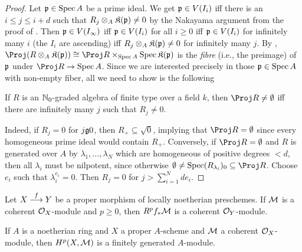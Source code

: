\documentclass[a4paper,parskip=half,numbers=enddot, DIV=12]{scrreprt}
\renewcommand{\leq}{\leqslant}
\renewcommand{\geq}{\geqslant}
\begin{document}
\begin{proof}
	Let $\mathfrak{p}\in \operatorname{Spec} A$ be a prime ideal. We get $\mathfrak{p}\in V(I_i)$ iff there is an $i\leq j\leq i+d$ such that $R_j\otimes_A\mathfrak{K}(\mathfrak{p})\neq 0$ by the Nakayama argument from the proof of \cite[Proposition~2.6.1]{alggeo1}. Then $\mathfrak{p}\in V(I_\infty)$ iff $\mathfrak{p}\in V(I_i)$ for all $i\geq 0$ iff $\mathfrak{p}\in V(I_i)$ for infinitely many $i$ (the $I_i$ are ascending) iff $R_j\otimes_A\mathfrak{K}(\mathfrak{p})\neq 0$ for infinitely many $j$. By \cite[Corollary~1.3.3]{alggeo1}, $\Proj(R\otimes_A\KK(\pp))\cong \Proj R\times_{\Spec A}\Spec \KK(\pp)$ is the \emph{fibre} (i.e., the preimage) of $\mathfrak{p}$ under $\Proj R\morphism\Spec A$. Since we are interested precisely in those $\mathfrak{p}\in\operatorname{Spec} A$ with non-empty fiber, all we need to show is the following
	\begin{claim*}
		If $R$ is an $\mathbb{N}_0$-graded algebra of finite type over a field $k$, then $\Proj R\neq\emptyset$ iff there are infinitely many $j$ such that $R_j\neq 0$.
	\end{claim*}
	Indeed, if $R_j=0$ for $j\gge 0$, then $R_+\subseteq \sqrt{0}$, implying that $\Proj R=\emptyset$ since every homogeneous prime ideal would contain $R_+$. Conversely, if $\Proj R=\emptyset$ and $R$ is generated over $A$ by $\lambda_1,\ldots,\lambda_N$ which are homogeneous of positive degrees $<d$, then all $\lambda_i$ must be nilpotent, since otherwise $\emptyset\neq\Spec (R_{\lambda_i})_0\subseteq \Proj R$. Choose $e_i$ such that $\lambda_i^{e_i}=0$. Then $R_j=0$ for $j>\sum_{i=1}^Nde_i$.
\end{proof}
\begin{thm}
	Let $X\morphism[f]Y$ be a proper morphism of locally noetherian preschemes. If $\mathcal{M}$ is a coherent $\mathcal{O}_X$-module and $p\geq 0$, then $R^pf_*\mathcal{M}$ is a coherent $\mathcal{O}_Y$-module.
\end{thm}
\begin{cor}
	If $A$ is a noetherian ring and $X$ a proper $A$-scheme and $\mathcal{M}$ a coherent $\mathcal{O}_X$-module, then $H^p(X,\mathcal{M})$ is a finitely generated $A$-module.
\end{cor}
\end{document}
